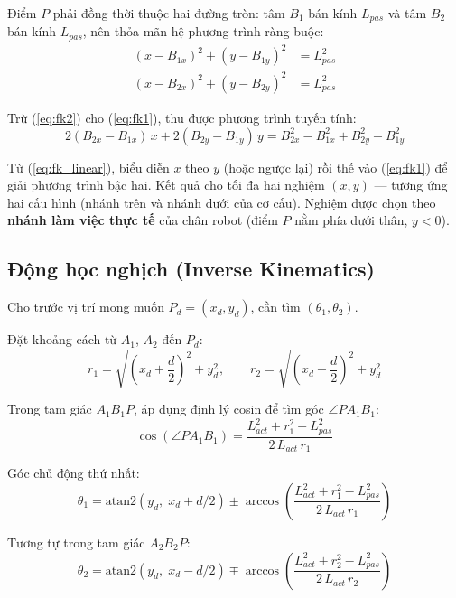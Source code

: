 Điểm $P$ phải đồng thời thuộc hai đường tròn: tâm $B_1$ bán kính $L_{pas}$
và tâm $B_2$ bán kính $L_{pas}$, nên thỏa mãn hệ phương trình ràng buộc:
\begin{align}
    (x - B_{1x})^2 + (y - B_{1y})^2 &= L_{pas}^2 \label{eq:fk1}\\
    (x - B_{2x})^2 + (y - B_{2y})^2 &= L_{pas}^2 \label{eq:fk2}
\end{align}

Trừ (\ref{eq:fk2}) cho (\ref{eq:fk1}), thu được phương trình tuyến tính:
\begin{equation}
    2(B_{2x} - B_{1x})\,x + 2(B_{2y} - B_{1y})\,y
    = B_{2x}^2 - B_{1x}^2 + B_{2y}^2 - B_{1y}^2
    \label{eq:fk_linear}
\end{equation}

Từ (\ref{eq:fk_linear}), biểu diễn $x$ theo $y$ (hoặc ngược lại) rồi thế
vào (\ref{eq:fk1}) để giải phương trình bậc hai. Kết quả cho tối đa hai
nghiệm $(x, y)$ --- tương ứng hai cấu hình (nhánh trên và nhánh dưới của
cơ cấu). Nghiệm được chọn theo \textbf{nhánh làm việc thực tế} của chân
robot (điểm $P$ nằm phía dưới thân, $y < 0$).


\subsection{Động học nghịch (Inverse Kinematics)}

Cho trước vị trí mong muốn $P_d = (x_d, y_d)$, cần tìm $(\theta_1, \theta_2)$.

Đặt khoảng cách từ $A_1$, $A_2$ đến $P_d$:
\begin{equation}
    r_1 = \sqrt{\!\left(x_d + \frac{d}{2}\right)^2 + y_d^2}, \qquad
    r_2 = \sqrt{\!\left(x_d - \frac{d}{2}\right)^2 + y_d^2}
    \label{eq:r1r2}
\end{equation}

Trong tam giác $A_1 B_1 P$, áp dụng định lý cosin để tìm góc $\angle PA_1B_1$:
\begin{equation}
    \cos(\angle PA_1B_1) = \frac{L_{act}^2 + r_1^2 - L_{pas}^2}{2\,L_{act}\,r_1}
    \label{eq:cosine_1}
\end{equation}

Góc chủ động thứ nhất:
\begin{equation}
    \theta_1 = \mathrm{atan2}(y_d,\; x_d + d/2)
    \pm \arccos\!\left(\frac{L_{act}^2 + r_1^2 - L_{pas}^2}{2\,L_{act}\,r_1}\right)
    \label{eq:ik1}
\end{equation}

Tương tự trong tam giác $A_2 B_2 P$:
\begin{equation}
    \theta_2 = \mathrm{atan2}(y_d,\; x_d - d/2)
    \mp \arccos\!\left(\frac{L_{act}^2 + r_2^2 - L_{pas}^2}{2\,L_{act}\,r_2}\right)
    \label{eq:ik2}
\end{equation}

